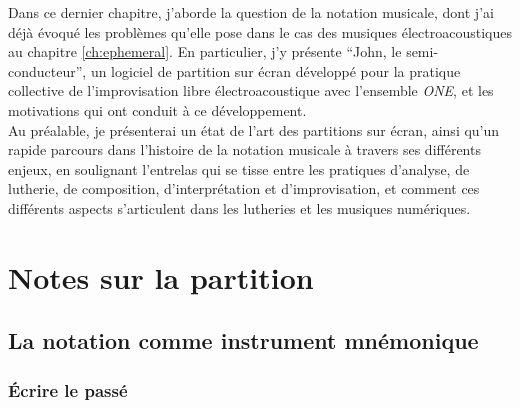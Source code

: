 \noindent Dans ce dernier chapitre, j'aborde la question de la notation musicale, dont j'ai déjà évoqué les problèmes qu'elle pose dans le cas des musiques électroacoustiques au chapitre \ref{ch:ephemeral}. En particulier, j'y présente ``John, le semi-conducteur'', un logiciel de partition sur écran développé pour la pratique collective de l'improvisation libre électroacoustique avec l'ensemble \textit{ONE}, et les motivations qui ont conduit à ce développement.\\
\indent Au préalable, je présenterai un état de l'art des partitions sur écran, ainsi qu'un rapide parcours dans l'histoire de la notation musicale à travers ses différents enjeux, en soulignant l'entrelas qui se tisse entre les pratiques d'analyse, de lutherie, de composition, d'interprétation et d'improvisation, et comment ces différents aspects s'articulent dans les lutheries et les musiques numériques.


\section{Notes sur la partition}

\subsection{La notation comme instrument mnémonique}

\subsubsection{Écrire le passé}

